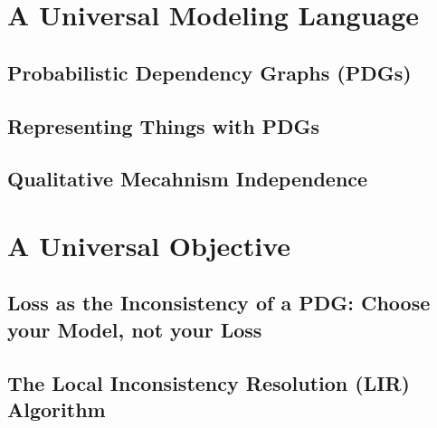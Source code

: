 \documentclass[tocprelim,
    ]{cornellmodified}
\begin{document}
\part{A Universal Modeling Language} \label{part:univ-model}

\chapter{Probabilistic Dependency Graphs (PDGs)} 
    
    
\chapter{Representing Things with PDGs}
    
     
\chapter{Qualitative Mecahnism Independence}
    

\part{A Universal Objective} \label{part:univ-objective}

\chapter{Loss as the Inconsistency of a PDG: 
    Choose your Model, not your Loss}
    
\chapter{ The Local Inconsistency Resolution (LIR) Algorithm }
    
    
\end{document}
